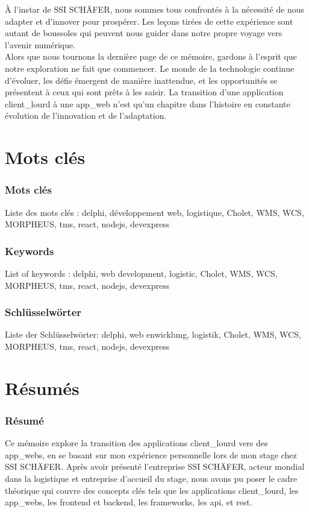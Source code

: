\documentclass[a4paper, 12pt, french]{article}
\begin{document}
		À l'instar de SSI SCHÄFER, nous sommes tous confrontés à la nécessité de nous adapter et d'innover pour prospérer. Les leçons tirées de cette expérience sont autant de boussoles qui peuvent nous guider dans notre propre voyage vers l'avenir numérique.\\

		Alors que nous tournons la dernière page de ce mémoire, gardons à l'esprit que notre exploration ne fait que commencer. Le monde de la technologie continue d'évoluer, les défis émergent de manière inattendue, et les opportunités se présentent à ceux qui sont prêts à les saisir. La transition d'une application \gls{client_lourd} à une \gls{app_web} n'est qu'un chapitre dans l'histoire en constante évolution de l'innovation et de l'adaptation.

		\newpage

	\part*{Mots clés}
		\section*{Mots clés}
			\noindent Liste des mots clés : delphi, développement web, logistique, Cholet, WMS, WCS, MORPHEUS, tms, react, nodejs, devexpress

		\section*{Keywords}
			\noindent List of keywords : delphi, web development, logistic, Cholet, WMS, WCS, MORPHEUS, tms, react, nodejs, devexpress

		\section*{Schlüsselwörter}
			Liste der Schlüsselwörter: delphi, web enwicklung, logistik, Cholet, WMS, WCS, MORPHEUS, tms, react, nodejs, devexpress
	\newpage

	\part*{Résumés}
		\section*{Résumé}
			Ce mémoire explore la transition des applications \gls{client_lourd} vers des \glspl{app_web}, en se basant sur mon expérience personnelle lors de mon stage chez SSI SCHÄFER. Après avoir présenté l'entreprise SSI SCHÄFER, acteur mondial dans la logistique et entreprise d'accueil du stage, nous avons pu poser le cadre théorique qui couvre des concepts clés tels que les applications \gls{client_lourd}, les \glspl{app_web}, les \gls{frontend} et \gls{backend}, les \glspl{framework}, les \acrshort{api}, et \acrshort{rest}.\\
\end{document}
